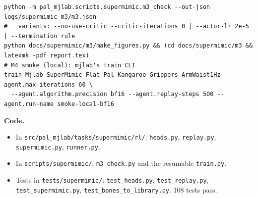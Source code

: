 \documentclass[10pt]{article}
\begin{document}
\begin{footnotesize}
\begin{verbatim}
python -m pal_mjlab.scripts.supermimic.m3_check --out-json logs/supermimic_m3/m3.json
#   variants: --no-use-critic --critic-iterations 0 | --actor-lr 2e-5 | --termination rule
python docs/supermimic/m3/make_figures.py && (cd docs/supermimic/m3 && latexmk -pdf report.tex)
# M4 smoke (local): mjlab's train CLI
train Mjlab-SuperMimic-Flat-Pal-Kangaroo-Grippers-ArmWaist1Hz --agent.max-iterations 60 \
  --agent.algorithm.precision bf16 --agent.replay-steps 500 --agent.run-name smoke-local-bf16
\end{verbatim}
\end{footnotesize}

\textbf{Code.}
\begin{itemize}
  \item In \texttt{src/pal\_mjlab/tasks/supermimic/rl/}: \texttt{heads.py}, \texttt{replay.py},
  \texttt{supermimic.py}, \texttt{runner.py}.
  \item In \texttt{scripts/supermimic/}: \texttt{m3\_check.py} and the resumable \texttt{train.py}.
  \item Tests in \texttt{tests/supermimic/}: \texttt{test\_heads.py}, \texttt{test\_replay.py},
  \texttt{test\_supermimic.py}, \texttt{test\_bones\_to\_library.py}. 108 tests pass.
\end{itemize}
\end{document}
